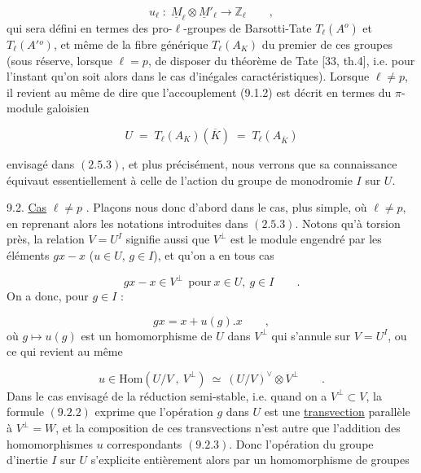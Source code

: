 \begin{equation}\tag{9.1.2}
u_{\ell} \;:\; \underline{M}_{\ell} \otimes \underline{M}'_{\ell} \longrightarrow \mathbb{Z}_{\ell} \qquad ,
\end{equation}
qui sera défini en termes des pro-$\ell$-groupes de Barsotti-Tate $T_{\ell}(A^{o})$ et $T_{\ell}(A'{}^{o})$, et même de la fibre générique $T_{\ell}(A_{K})$ du premier de ces groupes (sous réserve, lorsque $\ell=p$, de disposer du théorème de Tate [33, th.4], i.e. pour l'instant qu'on soit alors dans le cas d'inégales caractéristiques). Lorsque $\ell \neq p$, il revient au même de dire que l'accouplement (9.1.2) est décrit en termes du $\pi$-module galoisien

\begin{equation}\tag{9.1.3}
U \;=\; T_{\ell}(A_{K})(\overline{K}) \;=\; T_{\ell}(A_{\overline{K}})
\end{equation}


envisagé dans $(2.5.3)$, et plus précisément, nous verrons que sa connaissance équivaut essentiellement à celle de l'action du groupe de monodromie $I$ sur $U$.

9.2. \underline{Cas} $\ell \neq p$ . Plaçons nous donc d'abord dans le cas, plus simple, où $\ell \neq p$, en reprenant alors les notations introduites dans $(2.5.3)$. Notons qu'à torsion près, la relation $V = U^I$ signifie aussi que $V^{\perp}$ est le module engendré par les éléments $gx - x$ ($u \in U$, $g \in I$), et qu'on a en tous cas

\begin{equation}\tag{9.2.1}
gx - x \in V^{\perp} \ \ \mathrm{pour}\ x \in U,\ g \in I \qquad .
\end{equation}
On a donc, pour $g \in I$ :

\begin{equation}\tag{9.2.2}
gx = x + u(g).x \qquad ,
\end{equation}
où $g \longmapsto u(g)$ est un homomorphisme de $U$ dans $V^{\perp}$ qui s'annule sur $V= U^I$, ou ce qui revient au même

\begin{equation}\tag{9.2.3}
u \in \mathrm{Hom}(U/V\ ,\ V^{\perp}) \ \simeq\ (U/V)^{\vee} \otimes V^{\perp} \qquad .
\end{equation}
Dans le cas envisagé de la réduction semi-stable, i.e. quand on a $V^{\perp} \subset V$, la formule $(9.2.2)$ exprime que l'opération $g$ dans $U$ est une \underline{transvection} parallèle à $V^{\perp} = W$, et la composition de ces transvections n'est autre que l'addition des homomorphismes $u$ correspondants $(9.2.3)$. Donc l'opération du groupe d'inertie $I$ sur $U$ s'explicite entièrement alors par un homomorphisme de groupes

